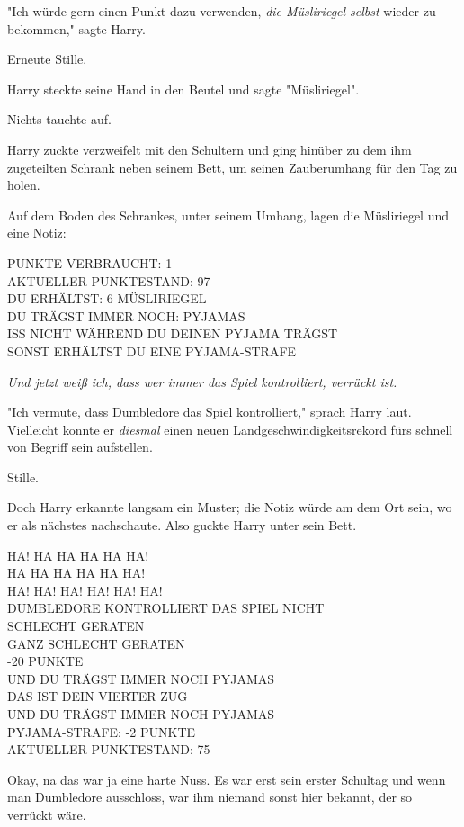 {"Ich würde gern einen Punkt dazu verwenden, \emph{die Müsliriegel selbst} wieder zu bekommen," sagte Harry.

Erneute Stille.

Harry steckte seine Hand in den Beutel und sagte "Müsliriegel".

Nichts tauchte auf.

Harry zuckte verzweifelt mit den Schultern und ging hinüber zu dem ihm zugeteilten Schrank neben seinem Bett, um seinen Zauberumhang für den Tag zu holen.

Auf dem Boden des Schrankes, unter seinem Umhang, lagen die Müsliriegel und eine Notiz:

PUNKTE VERBRAUCHT: 1\\ AKTUELLER PUNKTESTAND: 97\\ DU ERHÄLTST: 6 MÜSLIRIEGEL\\ DU TRÄGST IMMER NOCH: PYJAMAS\\ ISS NICHT WÄHREND DU DEINEN PYJAMA TRÄGST\\ SONST ERHÄLTST DU EINE PYJAMA-STRAFE

\emph{Und jetzt weiß ich, dass wer immer das Spiel kontrolliert, verrückt ist.}

"Ich vermute, dass Dumbledore das Spiel kontrolliert," sprach Harry laut. Vielleicht konnte er \emph{diesmal} einen neuen Landgeschwindigkeitsrekord fürs schnell von Begriff sein aufstellen.

Stille.

Doch Harry erkannte langsam ein Muster; die Notiz würde am dem Ort sein, wo er als nächstes nachschaute. Also guckte Harry unter sein Bett.

HA! HA HA HA HA HA!\\ HA HA HA HA HA HA!\\ HA! HA! HA! HA! HA! HA!\\ DUMBLEDORE KONTROLLIERT DAS SPIEL NICHT\\ SCHLECHT GERATEN\\ GANZ SCHLECHT GERATEN\\ -20 PUNKTE\\ UND DU TRÄGST IMMER NOCH PYJAMAS\\ DAS IST DEIN VIERTER ZUG\\ UND DU TRÄGST IMMER NOCH PYJAMAS\\ PYJAMA-STRAFE: -2 PUNKTE\\ AKTUELLER PUNKTESTAND: 75

Okay, na das war ja eine harte Nuss. Es war erst sein erster Schultag und wenn man Dumbledore ausschloss, war ihm niemand sonst hier bekannt, der so verrückt wäre.

}
